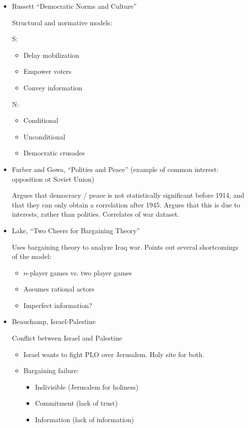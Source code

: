 \documentclass{article}
\begin{document}
  \begin{itemize}
    \item Russett ``Democratic Norms and Culture''

      Structural and normative models:

      S:
      \begin{itemize}
        \item Delay mobilization
        \item Empower voters
        \item Convey information
      \end{itemize}

      N:
      \begin{itemize}
        \item Conditional 
        \item Unconditional
        \item Democratic crusades
      \end{itemize}


    \item Farber and Gowa, ``Polities and Peace'' (example of common interest: opposition ot Soviet Union)

      Argues that democracy / peace is not statistically significant before 1914, and that they can only obtain a correlation after 1945.  Argues that this is due to interests, rather than polities.  Correlates of war dataset.

    \item Lake, ``Two Cheers for Bargaining Theory''

      Uses bargaining theory to analyze Iraq war.  Points out several shortcomings of the model:

      \begin{itemize}
        \item $n$-player games vs. two player games
        \item Assumes rational actors
        \item Imperfect information?
      \end{itemize}
 
    \item Beauchamp, Israel-Palestine
      
      Conflict between Israel and Palestine
      \begin{itemize}
        \item Israel wants to fight PLO over Jerusalem.  Holy site for both.
        \item Bargaining failure:
          \begin{itemize}
            \item Indivisible (Jerusalem for holiness)
            \item Commitment (lack of trust)
            \item Information (lack of information)
          \end{itemize}
      \end{itemize}


\end{itemize}
\end{document}
